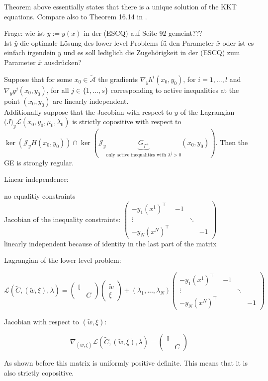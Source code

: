 Theorem above essentially states that there is a unique solution of the KKT equations.
Compare also to Theorem 16.14 in \cite{Ulbrich2012}.

Frage: wie ist \(\bar{y}:=y(\bar{x})\) in der (ESCQ) auf Seite 92 gemeint???\\
Ist \(\bar{y}\) die optimale L\"osung des lower level Problems f\"u den Parameter \(\bar{x}\) oder ist es einfach irgendein \(y\) und es soll lediglich die Zugeh\"origkeit in der (ESCQ) zum Parameter \(\bar{x}\) ausdr\"ucken?

\begin{theorem}
	Suppose that for some \(x_0 \in \tilde{\mathcal{A}}\) the gradients \(\nabla_y h^i(x_0,y_0)\), for \(i = 1,...,l\) and \(\nabla_y g^j(x_0,y_0)\), for all \(j \in \{1,...,s\}\) corresponding to active inequalities at the point \((x_0,y_0)\) are linearly independent.\\
	Additionally suppose that the Jacobian with respect to \(y\) of the Lagrangian \(\mathcal(J)_y\mathcal{L}(x_0,y_0,\mu_0,\lambda_0)\) is strictly copositive with respect to \(\ker(\mathcal{J}_y H(x_0,y_0))\cap\ker(\mathcal{J}_y\underbrace{G_{I^+}}_{\text{only active inequalities with } \lambda^j > 0}(x_0,y_0))\).
	Then the GE is strongly regular.
\end{theorem}

Linear independence:

no equalitiy constraints \\
Jacobian of the inequality constraints: \(\begin{pmatrix}-y_1(x^1)^{\top} & -1 \\
		\vdots & & \ddots \\ -y_N(x^N)^{\top} & & & -1\end{pmatrix}\) \\
		linearly independent because of identity in the last part of the matrix

Lagrangian of the lower level problem:

\[ \mathcal{L}(\tilde{C},(\tilde{w},\xi),\lambda) = \begin{pmatrix} \mathbb{I}\\ & C \end{pmatrix} \begin{pmatrix}	\tilde{w}\\ \xi \end{pmatrix} + (\lambda_1,...,\lambda_N)\begin{pmatrix}-y_1(x^1)^{\top} & -1 \\
		\vdots & & \ddots \\ -y_N(x^N)^{\top} & & & -1\end{pmatrix} \]

Jacobian with respect to \((\tilde{w},\xi)\):

\[ \nabla_{(\tilde{w},\xi)}\mathcal{L}(\tilde{C},(\tilde{w},\xi),\lambda) = \begin{pmatrix} \mathbb{I}\\ & C \end{pmatrix} \]

As shown before this matrix is uniformly positive definite. This means that it is also strictly copositive.








